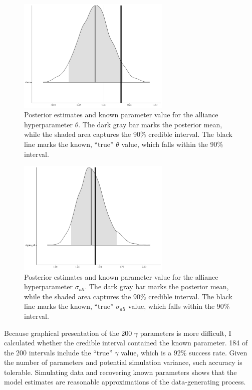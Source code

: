 \documentclass[12pt]{article}
\begin{document}
\begin{figure}[htbp]
	\centering
		\includegraphics[width=0.65\textwidth]{theta-sim-res.pdf}
	\caption{Posterior estimates and known parameter value for the alliance hyperparameter $\theta$. The dark gray bar marks the posterior mean, while the shaded area captures the 90\% credible interval. The black line marks the known, ``true'' $\theta$ value, which falls within the 90\% interval.}
	\label{fig:theta-sim-res}
\end{figure}


\begin{figure}[htbp]
	\centering
		\includegraphics[width=0.65\textwidth]{sall-sim-res.pdf}
	\caption{Posterior estimates and known parameter value for the alliance hyperparameter $\sigma_{all}$. The dark gray bar marks the posterior mean, while the shaded area captures the 90\% credible interval. The black line marks the known, ``true'' $\sigma_{all}$ value, which falls within the 90\% interval.}
	\label{fig:sall-sim-res}
\end{figure}


Because graphical presentation of the 200 $\gamma$ parameters is more difficult, I calculated whether the credible interval contained the known parameter. 
184 of the 200 intervals include the ``true'' $\gamma$ value, which is a 92\% success rate. 
Given the number of parameters and potential simulation variance, such accuracy is tolerable. 
Simulating data and recovering known parameters shows that the model estimates are reasonable approximations of the data-generating process. 
 
\end{document}
